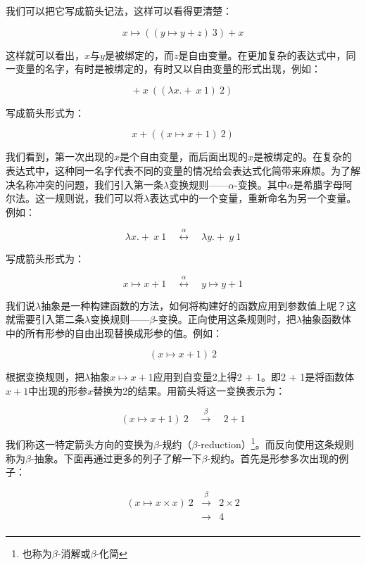 \documentclass[b5paper]{ctexart}
\begin{document}
我们可以把它写成箭头记法，这样可以看得更清楚：

\[
x \mapsto ((y \mapsto y + z)\ 3) + x
\]

这样就可以看出，$x$与$y$是被绑定的，而$z$是自由变量。在更加复杂的表达式中，同一变量的名字，有时是被绑定的，有时又以自由变量的形式出现，例如：

\[
+\ x\ ((\lambda x . +\ x\ 1)\ 2)
\]

写成箭头形式为：

\[
x + ((x \mapsto x + 1)\ 2)
\]

 
我们看到，第一次出现的$x$是个自由变量，而后面出现的$x$是被绑定的。在复杂的表达式中，这种同一名字代表不同的变量的情况给会表达式化简带来麻烦。为了解决名称冲突的问题，我们引入第一条$\lambda$变换规则——$\alpha$-变换。其中$\alpha$是希腊字母阿尔法。这一规则说，我们可以将$\lambda$表达式中的一个变量，重新命名为另一个变量。例如：

\[
\lambda x . +\ x\ 1 \quad \overset{\alpha}{\longleftrightarrow} \quad \lambda y . +\ y\ 1
\]


写成箭头形式为：

\[
x \mapsto x + 1 \quad \overset{\alpha}{\longleftrightarrow} \quad y \mapsto y + 1
\]

我们说$\lambda$抽象是一种构建函数的方法，如何将构建好的函数应用到参数值上呢？这就需要引入第二条$\lambda$变换规则——$\beta$-变换。正向使用这条规则时，把$\lambda$抽象函数体中的所有形参的自由出现替换成形参的值。例如：

\[
(x \mapsto x + 1)\ 2
\]

根据变换规则，把$\lambda$抽象$x \mapsto x + 1$应用到自变量2上得2 + 1。即2 + 1是将函数体$x + 1$中出现的形参$x$替换为2的结果。用箭头将这一变换表示为：

\[
(x \mapsto x + 1)\ 2 \quad \overset{\beta}{\longrightarrow} \quad 2 + 1
\]

我们称这一特定箭头方向的变换为$\beta$-规约（$\beta$-reduction）\footnote{也称为$\beta$-消解或$\beta$-化简}。而反向使用这条规则称为$\beta$-抽象。下面再通过更多的列子了解一下$\beta$-规约。首先是形参多次出现的例子：

\[
\begin{array}{rcl}
(x \mapsto x \times x)\ 2 & \overset{\beta}{\longrightarrow} & 2 \times 2 \\
                          & \longrightarrow & 4 \\
\end{array}
\]
\end{document}
